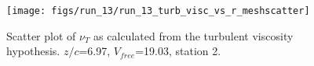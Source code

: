 \begin{figure}[H]
\centering
\texttt{[image: figs/run\_13/run\_13\_turb\_visc\_vs\_r\_meshscatter]}
\caption{Scatter plot of $\nu_T$ as calculated from the turbulent viscosity hypothesis. $z/c$=6.97, $V_{free}$=19.03, station 2.}
\label{fig:run_13_turb_visc_vs_r_meshscatter}
\end{figure}



